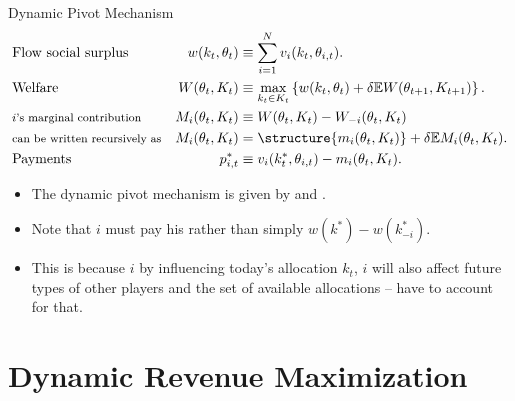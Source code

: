 \documentclass[english,10pt
,aspectratio=169
]{beamer}
\begin{document}
\begin{frame}{Dynamic Pivot Mechanism}
\vspace{-2em}\begin{align*}
	&\text{Flow social surplus}	& w(k_t,\theta_t)	&\equiv \sum_{i=1}^N v_i(k_t,\theta_{i,t}).
	\\
	&\text{Welfare}	& W(\theta_t,K_t)	&\equiv \max_{k_t \in K_t} \left\{ w(k_t,\theta_t) + \delta \mathbb{E} W(\theta_{t+1},K_{t+1}) \right\}.
	\\
	&\text{\footnotesize $i$'s marginal contribution}	& M_i(\theta_t,K_t)	&\equiv W(\theta_t,K_t) - W_{-i}(\theta_t,K_t)
	\\
	&\text{\footnotesize can be written recursively as}	& M_i(\theta_t,K_t)	&= \structure{m_i(\theta_t,K_t)} + \delta \mathbb{E} M_i(\theta_t,K_t).
	\\
	&\text{Payments}	& p_{i,t}^*	&\equiv v_i(k^*_t,\theta_{i,t}) - m_i(\theta_t,K_t).
\end{align*}\vspace{-1em}

\begin{itemize}
	\item The dynamic pivot mechanism is given by \structure{$\kappa = \kappa^*$} and .
	\item Note that $i$ must pay his  rather than simply $w(k^*)-w(k^*_{-i})$.
	\item This is because $i$ by influencing today's allocation $k_t$, $i$ will also affect future types of other players and the set of available allocations -- have to account for that.
\end{itemize}
\end{frame}



\section{Dynamic Revenue Maximization}
\end{document}
